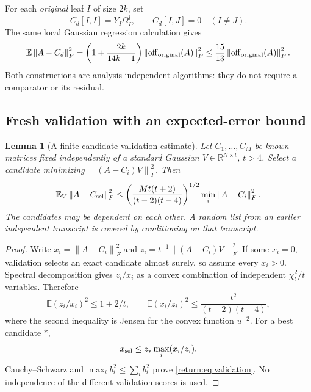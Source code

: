 \documentclass[11pt,oneside,openany,a4paper]{book}
\numberwithin{equation}{chapter}
\newtheorem{lemma}[theorem]{Lemma}
\theoremstyle{definition}
\theoremstyle{remark}
\newcommand{\R}{\mathbb R}\newcommand{\E}{\mathbb E}\newcommand{\Prb}{\mathbb P}\newcommand{\PP}{\mathbb P}
\newcommand{\F}[1]{\left\lVert#1\right\rVert_F}
\begin{document}
For each \emph{original} leaf $I$ of size $2k$, set
\[
 C_d[I,I]=Y_I\Omega_I^\dagger,\qquad C_d[I,J]=0\quad(I\ne J).
\]
The same local Gaussian regression calculation gives
\begin{equation}\label{return:eq:diagguard}
 \E\F{A-C_d}^2
  =\left(1+\frac{2k}{14k-1}\right)
       \F{\operatorname{off}_{\rm original}(A)}^2
  \le\frac{15}{13}\F{\operatorname{off}_{\rm original}(A)}^2.
\end{equation}
Both constructions are analysis-independent algorithms: they do not require a comparator or its residual.

\subsection{Fresh validation with an expected-error bound}
\begin{lemma}[A finite-candidate validation estimate]\label{return:lem:validation}
Let $C_1,\ldots,C_M$ be known matrices fixed independently of a standard Gaussian $V\in\R^{N\times t}$, $t>4$. Select a candidate minimizing $\F{(A-C_i)V}^2$. Then
\begin{equation}\label{return:eq:validation}
 \E_V\F{A-C_{\rm sel}}^2
 \le\left(\frac{Mt(t+2)}{(t-2)(t-4)}\right)^{1/2}
      \min_i\F{A-C_i}^2.
\end{equation}
The candidates may be dependent on each other. A random list from an earlier independent transcript is covered by conditioning on that transcript.
\end{lemma}
\begin{proof}
Write $x_i=\F{A-C_i}^2$ and $z_i=t^{-1}\F{(A-C_i)V}^2$. If some $x_i=0$, validation selects an exact candidate almost surely, so assume every $x_i>0$. Spectral decomposition gives $z_i/x_i$ as a convex combination of independent $\chi_t^2/t$ variables. Therefore
\[
 \E(z_i/x_i)^2\le1+2/t,\qquad
 \E(x_i/z_i)^2\le\frac{t^2}{(t-2)(t-4)},
\]
where the second inequality is Jensen for the convex function $u^{-2}$. For a best candidate $*$,
\[
 x_{\rm sel}\le z_*\max_i(x_i/z_i).
\]
Cauchy--Schwarz and $\max_i b_i^2\le\sum_i b_i^2$ prove \eqref{return:eq:validation}. No independence of the different validation scores is used.
\end{proof}
\end{document}
